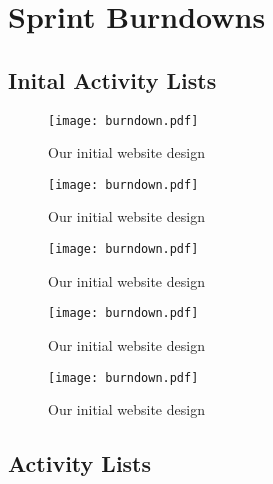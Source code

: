 \chapter{Sprint Burndowns}\label{appendix:burndown}

\section{Inital Activity Lists}

\begin{figure}[h!]
    \centering
	\texttt{[image: burndown.pdf]}
	\caption{Our initial website design}
	\label{fig:old_website_design}
\end{figure}

\begin{figure}[h!]
    \centering
	\texttt{[image: burndown.pdf]}
	\caption{Our initial website design}
	\label{fig:old_website_design}
\end{figure}

\begin{figure}[h!]
    \centering
	\texttt{[image: burndown.pdf]}
	\caption{Our initial website design}
	\label{fig:old_website_design}
\end{figure}

\begin{figure}[h!]
    \centering
	\texttt{[image: burndown.pdf]}
	\caption{Our initial website design}
	\label{fig:old_website_design}
\end{figure}


\begin{figure}[h!]
    \centering
	\texttt{[image: burndown.pdf]}
	\caption{Our initial website design}
	\label{fig:old_website_design}
\end{figure}


% 
% 
% 
\section{Activity Lists}

